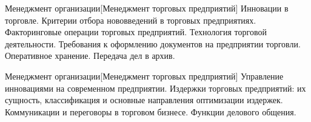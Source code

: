 \documentclass[
	11pt,
	a4paper,
	]
	{article}
\begin{document}
\vfill



\begin{minipage}[t][\miniH]{\miniL}\centering
	 {Менеджмент организации}[Менеджмент торговых предприятий]
		{
			Инновации в торговле. Критерии отбора нововведений в торговых предприятиях.
		}{
			Факторинговые операции торговых предприятий. Технология торговой деятельности.
		}{
			Требования к оформлению документов на предприятии торговли. Оперативное хранение. Передача дел в архив.
		}
	\lowGE
\end{minipage}





\begin{minipage}[t][\miniH]{\miniL}\centering
	 {Менеджмент организации}[Менеджмент торговых предприятий]
		{
			Управление инновациями на современном предприятии.
		}{
			Издержки торговых предприятий: их сущность, классификация и основные направления оптимизации издержек.
		}{
			Коммуникации и переговоры в торговом бизнесе. Функции делового общения.
		}
	\lowGE
\end{minipage}

\vfill

	
\end{document}
